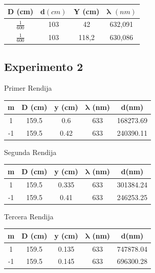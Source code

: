 \documentclass[13,twocolumn,letterpaper]{article}
\begin{document}
\begin{table}[h]
    \centering
    \begin{tabular}{|| c | c | c | c ||}
\hline 
D (cm) & \textbf{d}$(cm)$ & Y (cm) & $\mathbf{\lambda}$ $(n m)$ \\ \hline
$\frac{1}{600}$ & 103 & 42 & 632,091 \\ \hline
$\frac{1}{600}$ & 103 & 118,2 & 630,086  \\ \hline
    \end{tabular}
    \label{tab:my_label}
\end{table}
\pagebreak
\subsection*{Experimento 2}

Primer Rendija \\

\begin{table}[h]
    \centering
    \begin{tabular}{|| c | c | c | c | c ||}
\hline 
m & D (cm) & y (cm) & $\mathbf{\lambda}$ (nm) & d(nm) \\ \hline
1 & 159.5 & 0.6 & 633 & 168273.69 \\ \hline
-1 & 159.5 & 0.42 & 633 & 240390.11 \\ \hline
 \end{tabular}
    \label{tab:my_label}
\end{table}

Segunda Rendija \\

\begin{table}[h]
    \centering
    \begin{tabular}{|| c | c | c | c | c ||}
\hline 
m & D (cm) & y (cm) & $\mathbf{\lambda}$ (nm) & d(nm) \\ \hline
1 & 159.5 & 0.335 & 633 & 301384.24 \\ \hline
-1 & 159.5 & 0.41 & 633 & 246253.25 \\ \hline
 \end{tabular}
    \label{tab:my_label}
\end{table}

Tercera Rendija \\

\begin{table}[H]
    \centering
    \begin{tabular}{|| c | c | c | c | c ||}
\hline 
m & D (cm) & y (cm) & $\mathbf{\lambda}$ (nm) & d(nm) \\ \hline
1 & 159.5 & 0.135 & 633 & 747878.04 \\ \hline
-1 & 159.5 & 0.145 & 633 & 696300.28 \\ \hline
 \end{tabular}
\end{table}
\end{document}
